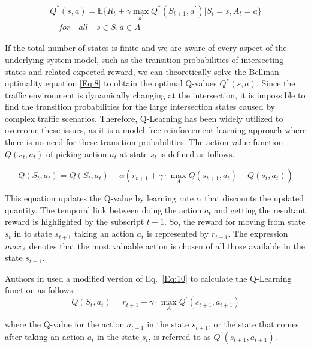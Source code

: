 \documentclass[conference]{IEEEtran}
\begin{document}
\begin{equation}
\label{Eq:8}
\begin{aligned}
     Q^*(s, a)=\mathbb{\mathbb{E}}\{R_t+\gamma \underset{a^{\prime}}{\operatorname{max}}Q^*(S_{t+1}, a^{\prime})| S_t=s, A_t=a\} \\
    \quad for \quad all \quad s\in S, a \in A
\end{aligned}
\end{equation}

If the total number of states is finite and we are aware of every aspect of the underlying system model, such as the transition probabilities of intersecting states and related expected reward, we can theoretically solve the Bellman optimality equation \ref{Eq:8} to obtain the optimal Q-values $Q^*(s,a)$. Since the traffic environment is dynamically changing at the intersection, it is impossible to find the transition probabilities for the large intersection states caused by complex traffic scenarios. Therefore, Q-Learning has been widely utilized to overcome these issues, as it is a model-free\cite{watkins1989learning} reinforcement learning approach where there is no need for these transition probabilities. The action value function $Q\left(s_t, a_t\right)$ of picking action $a_t$ at state $s_t$ is defined as follows.


\begin{equation}
   \label{Eq:9}
   Q(S_{t},a_{t})= Q(S_{t},a_{t})+\alpha(r_{t+1}+\gamma \cdot \max_{A}Q(s_{t+1},a_{t})-Q(s_{t},a_{t}))
\end{equation}

This equation updates the Q-value by learning rate $\alpha$ that discounts the updated quantity. The temporal link between doing the action $a_t$ and getting the resultant reward is highlighted by the subscript $t+1$. So, the reward for moving from state $s_t$ in to state $s_{t+1}$ taking an action $a_t$ is represented by $r_{t+1}$. The expression $max _A$ denotes that the most valuable action is chosen of all those available in the state $s_{t+1}$. 

Authors in \cite{Deep} used a modified version of Eq.~\ref{Eq:10} to calculate the Q-Learning function as follows.
\begin{equation}
   \label{Eq:10}
   Q(S_{t},a_{t})= r_{t+1}+\gamma \cdot \max_{A}Q^{\prime}(s_{t+1},a_{t+1})
\end{equation}

where the Q-value for the action $a_{t+1}$ in the state $s_{t+1}$, or the state that comes after taking an action $a_{t}$ in the state $s_{t}$, is referred to as $Q^{\prime}(s_{t+1},a_{t+1})$. 
\end{document}
